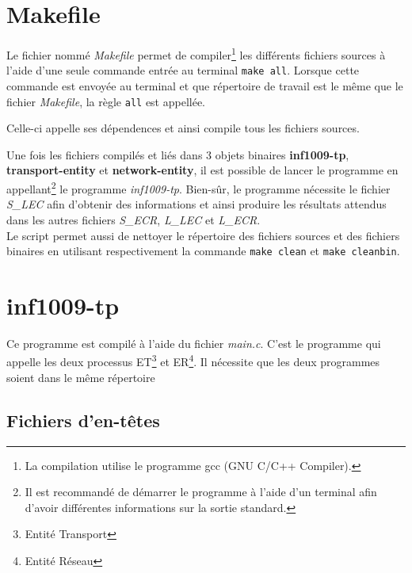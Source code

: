 \documentclass[11pt,french]{article}
\begin{document}
    \lstset{language=make}
    \section{Makefile} %
    \label{sec:makefile}
        Le fichier nommé \emph{Makefile} permet de compiler\footnote{La compilation utilise le programme
        gcc (GNU C/C++ Compiler).} les différents fichiers sources
        à l'aide d'une seule commande entrée au terminal \texttt{make all}. Lorsque cette commande
        est envoyée au terminal et que répertoire de travail est le même que le fichier \emph{Makefile},
        la règle \texttt{all} est appellée.
        
        Celle-ci appelle ses dépendences et ainsi compile tous les 
        fichiers sources.
        

        Une fois les fichiers compilés et liés dans 3 objets binaires
        {\bf inf1009-tp}, {\bf transport-entity} et {\bf network-entity},
        il est possible de lancer le programme en appellant\footnote{Il est recommandé de
        démarrer le programme à l'aide d'un terminal afin d'avoir différentes informations sur
        la sortie standard.} le programme \emph{inf1009-tp}.
        Bien-sûr, le programme nécessite le fichier \emph{S\_LEC} afin d'obtenir des informations et
        ainsi produire les résultats attendus dans les autres fichiers \emph{S\_ECR}, \emph{L\_LEC}
        et \emph{L\_ECR}.\\

        Le script permet aussi de nettoyer le répertoire des fichiers sources et des fichiers binaires
        en utilisant respectivement la commande \texttt{make clean} et \texttt{make cleanbin}.
        
    
    \lstset{language=c}
    
    \section{inf1009-tp} %
    \label{sec:inf1009-tp}
        Ce programme est compilé à l'aide du fichier \emph{main.c}. C'est le programme qui appelle
        les deux processus ET\footnote{Entité Transport} et ER\footnote{Entité Réseau}. Il nécessite
        que les deux programmes soient dans le même répertoire
        
        \subsection{Fichiers d'en-têtes} %
        \label{sub:fich-entete}
            
\end{document}

